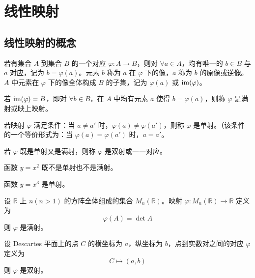 \chapter{线性映射}


\section{线性映射的概念}

\begin{definition}
  若有集合 $A$ 到集合 $B$ 的一个对应 $\varphi : A \to B$，则对 $\forall a \in A$，均有唯一的 $b \in B$ 与 $a$ 对应，记为 $b = \varphi(a)$。元素 $b$ 称为 $a$ 在 $\varphi$ 下的像，$a$ 称为 $b$ 的原像或逆像。$A$ 中元素在 $\varphi$ 下的像全体构成 $B$ 的子集，记为 $\varphi(a)$ 或 $\operatorname{im}(\varphi)$。

  若 $\operatorname{im}(\varphi) = B$，即对 $\forall b \in B$，在 $A$ 中均有元素 $a$ 使得 $b = \varphi(a)$，则称 $\varphi$ 是满射或映上映射。

  若映射 $\varphi$ 满足条件：当 $a \ne a'$ 时，$\varphi(a) \ne \varphi(a')$，则称 $\varphi$ 是单射。（该条件的一个等价形式为：当 $\varphi(a) = \varphi(a')$ 时，$a = a'$。

  若 $\varphi$ 既是单射又是满射，则称 $\varphi$ 是双射或一一对应。
\end{definition}

\hfill

\begin{example}
  函数 $y = x^2$ 既不是单射也不是满射。
\end{example}

\hfill

\begin{example}
  函数 $y = x^3$ 是单射。
\end{example}

\hfill

\begin{example}
  设 $\mathbb{R}$ 上 $n(n > 1)$ 的方阵全体组成的集合 $M_n(\mathbb{R})$。映射 $\varphi : M_n(\mathbb{R}) \to \mathbb{R}$ 定义为
  \[\varphi(A) = \det A\]
  则 $\varphi$ 是满射。
\end{example}

\hfill

\begin{example}
  设 Descartes 平面上的点 $C$ 的横坐标为 $a$，纵坐标为 $b$，点到实数对之间的对应 $\varphi$ 定义为
  \[C \mapsto (a, b)\]
  则 $\varphi$ 是双射。
\end{example}

